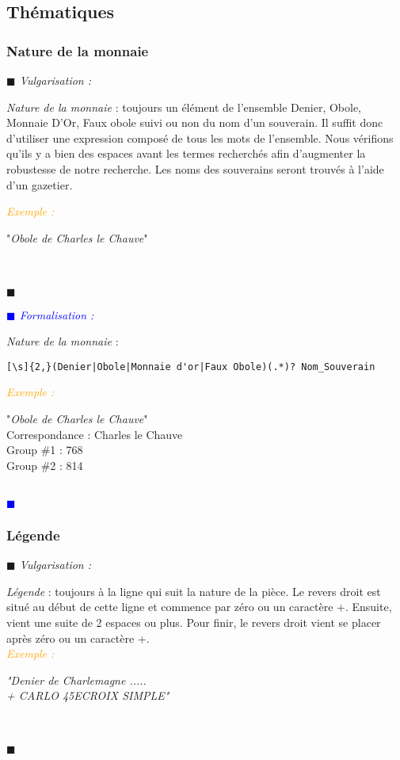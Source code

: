 \documentclass[a4paper, 11pt]{book}
\newenvironment{vulgarisation}
    {
    \textit{\textcolor{dark-blue}{$\blacksquare$  Vulgarisation : \\}}

    }
    {
    ~\\\textcolor{dark-blue}{$\blacksquare$}\\
    }
\newenvironment{formalisation}
    {
    \textit{\textcolor{blue}{$\blacksquare$  Formalisation : \\}}
    }
    {
    ~\\\textcolor{blue}{$\blacksquare$}\\
    }
\newenvironment{exemple}
    {
    \textit{\textcolor{orange}{
    Exemple : \\}}
    }
    {\\
    }
\begin{document}
\newpage
\subsection{Thématiques}
\subsubsection{Nature de la monnaie}
\begin{vulgarisation}
	\textit{Nature de la monnaie} : toujours un élément de l'ensemble {Denier, Obole, Monnaie D'Or, Faux obole} suivi ou non du nom d'un souverain. Il suffit donc d'utiliser une expression composé de tous les mots de l'ensemble. Nous vérifions qu'ils y a bien des espaces avant les termes recherchés afin d'augmenter la robustesse de notre recherche. Les noms des souverains seront trouvés à l'aide d'un gazetier.
	
	\begin{exemple}
		"\emph{Obole de Charles le Chauve}" \\
	\end{exemple}
\end{vulgarisation}

\begin{formalisation}
	\textit{Nature de la monnaie} :
	\begin{verbatim}
[\s]{2,}(Denier|Obole|Monnaie d'or|Faux Obole)(.*)? Nom_Souverain
	\end{verbatim}
	\begin{exemple}
		"\emph{Obole de Charles le Chauve}" \\
		Correspondance : Charles le Chauve \\
		Group \#1 : 768 \\
		Group \#2 : 814
	\end{exemple}
\end{formalisation}

\subsubsection{Légende}
\begin{vulgarisation}
	\textit{Légende} : toujours à la ligne qui suit la nature de la pièce. Le revers droit est situé au début de cette ligne et commence par zéro ou un caractère +. Ensuite, vient une suite de 2 espaces ou plus. Pour finir, le revers droit vient se placer après zéro ou un caractère +.\\
	\begin{exemple}
		\emph{"Denier de Charlemagne ..... \\+ CARLO  45E\indent\indent CROIX SIMPLE"}\\
	\end{exemple}
\end{vulgarisation}
\end{document}
